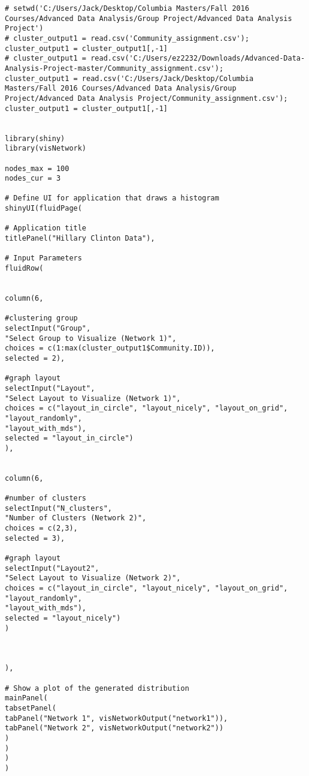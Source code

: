 \begin{verbatim}
# setwd('C:/Users/Jack/Desktop/Columbia Masters/Fall 2016 Courses/Advanced Data Analysis/Group Project/Advanced Data Analysis Project')
# cluster_output1 = read.csv('Community_assignment.csv'); cluster_output1 = cluster_output1[,-1]
# cluster_output1 = read.csv('C:/Users/ez2232/Downloads/Advanced-Data-Analysis-Project-master/Community_assignment.csv');
cluster_output1 = read.csv('C:/Users/Jack/Desktop/Columbia Masters/Fall 2016 Courses/Advanced Data Analysis/Group Project/Advanced Data Analysis Project/Community_assignment.csv'); 
cluster_output1 = cluster_output1[,-1]


library(shiny)
library(visNetwork)

nodes_max = 100
nodes_cur = 3

# Define UI for application that draws a histogram
shinyUI(fluidPage(

# Application title
titlePanel("Hillary Clinton Data"),

# Input Parameters
fluidRow(


column(6,

#clustering group
selectInput("Group",
"Select Group to Visualize (Network 1)",
choices = c(1:max(cluster_output1$Community.ID)),
selected = 2),

#graph layout
selectInput("Layout",
"Select Layout to Visualize (Network 1)",
choices = c("layout_in_circle", "layout_nicely", "layout_on_grid", "layout_randomly",
"layout_with_mds"),
selected = "layout_in_circle")
),


column(6,

#number of clusters
selectInput("N_clusters",
"Number of Clusters (Network 2)",
choices = c(2,3),
selected = 3),

#graph layout
selectInput("Layout2",
"Select Layout to Visualize (Network 2)",
choices = c("layout_in_circle", "layout_nicely", "layout_on_grid", "layout_randomly",
"layout_with_mds"),
selected = "layout_nicely")
)



),

# Show a plot of the generated distribution
mainPanel(
tabsetPanel(
tabPanel("Network 1", visNetworkOutput("network1")),
tabPanel("Network 2", visNetworkOutput("network2"))
)
)
)
)

\end{verbatim}